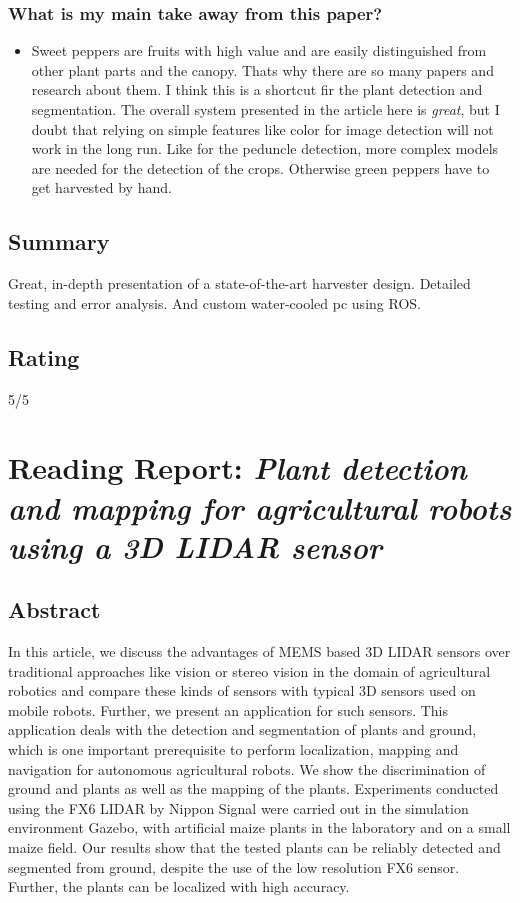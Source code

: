 \subsubsection*{What is my main take away from this paper?}
\begin{itemize}
    \item Sweet peppers are fruits with high value and are easily distinguished from other plant parts and the canopy. Thats why there are so many papers and research about them. I think this is a shortcut fir the plant detection and segmentation. The overall system presented in the article here is \emph{great}, but I doubt that relying on simple features like color for image detection will not work in the long run. Like for the peduncle detection, more complex models are needed for the detection of the crops. Otherwise green peppers have to get harvested by hand.
\end{itemize}

\subsection*{Summary}
Great, in-depth presentation of a state-of-the-art harvester design. Detailed testing and error analysis. And custom water-cooled pc using ROS.
\subsection*{Rating}
5/5





\section{Reading Report: \emph{Plant detection and mapping for agricultural robots using a 3D LIDAR sensor}}
\cite{Weiss2011}

\subsection*{Abstract}

In this article, we discuss the advantages of MEMS based 3D LIDAR sensors over traditional approaches
like vision or stereo vision in the domain of agricultural robotics and compare these kinds of sensors
with typical 3D sensors used on mobile robots. Further, we present an application for such sensors. This
application deals with the detection and segmentation of plants and ground, which is one important
prerequisite to perform localization, mapping and navigation for autonomous agricultural robots. We
show the discrimination of ground and plants as well as the mapping of the plants. Experiments conducted
using the FX6 LIDAR by Nippon Signal were carried out in the simulation environment Gazebo, with
artificial maize plants in the laboratory and on a small maize field. Our results show that the tested plants
can be reliably detected and segmented from ground, despite the use of the low resolution FX6 sensor.
Further, the plants can be localized with high accuracy.


